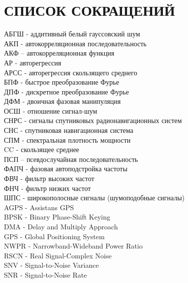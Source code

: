 \section*{СПИСОК СОКРАЩЕНИЙ}
\noindent
АБГШ - аддитивный белый гауссовский шум				\\
АКП - автокорреляционная последовательность			\\
АКФ – автокорреляционная функция				\\
АР - авторегрессия						\\
АРСС - авторегрессия скользящего среднего			\\
БПФ - быстрое преобразование Фурье				\\
ДПФ - дискретное преобразование Фурье				\\
ДФМ - двоичная фазовая манипуляция				\\
ОСШ - отношение сигнал-шум 					\\
СНРС - сигналы спутниковых радионавигационных систем		\\
СНС - спутниковая навигационная система				\\
СПМ - спектральная плотность мощности				\\
CC - скользящее среднее						\\
ПСП – псевдослучайная последовательность			\\
ФАПЧ - фазовая автоподстройка частоты				\\
ФВЧ - фильтр высоких частот					\\
ФНЧ - фильтр низких частот					\\
ШПС -  широкополосные сигналы (шумоподобные сигналы)		\\

\noindent
AGPS - Assistans GPS						\\
BPSK - Binary Phase-Shift Keying				\\
DMA - Delay and Multiply Approach				\\
GPS - Global Positioning System					\\
NWPR - Narrowband-Wideband Power Ratio				\\
RSCN - Real Signal-Complex Noise				\\
SNV - Signal-to-Noise Variance					\\
SNR - Signal-to-Noise Rate					\\

\newpage
